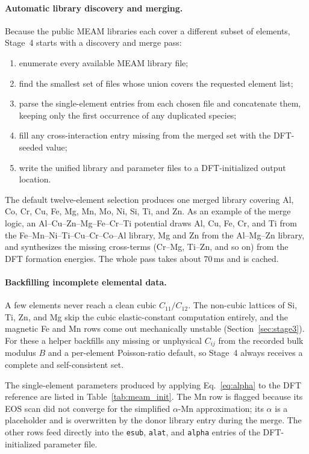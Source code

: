 \paragraph{Automatic library discovery and merging.}
Because the public MEAM libraries each cover a different subset of elements,
Stage~4 starts with a discovery and merge pass:
\begin{enumerate}
	\item enumerate every available MEAM library file;
	\item find the smallest set of files whose union covers the requested
	      element list;
	\item parse the single-element entries from each chosen file and
	      concatenate them, keeping only the first occurrence of any duplicated
	      species;
	\item fill any cross-interaction entry missing from the merged set with the
	      DFT-seeded value;
	\item write the unified library and parameter files to a DFT-initialized
	      output location.
\end{enumerate}
The default twelve-element selection produces one merged library covering Al,
Co, Cr, Cu, Fe, Mg, Mn, Mo, Ni, Si, Ti, and Zn. As an example of the merge
logic, an Al--Cu--Zn--Mg--Fe--Cr--Ti potential draws Al, Cu, Fe, Cr, and Ti
from the Fe--Mn--Ni--Ti--Cu--Cr--Co--Al library, Mg and Zn from the
Al--Mg--Zn library, and synthesizes the missing cross-terms (Cr--Mg, Ti--Zn,
and so on) from the DFT formation energies. The whole pass takes about
$70$\,ms and is cached.

\paragraph{Backfilling incomplete elemental data.}
A few elements never reach a clean cubic $C_{11}/C_{12}$. The non-cubic
lattices of Si, Ti, Zn, and Mg skip the cubic elastic-constant computation
entirely, and the magnetic Fe and Mn rows come out mechanically unstable
(Section~\ref{sec:stage3}). For these a helper backfills any missing or
unphysical $C_{ij}$ from the recorded bulk modulus $B$ and a per-element
Poisson-ratio default, so Stage~4 always receives a complete and
self-consistent set.

The single-element parameters produced by applying Eq.~\eqref{eq:alpha} to the
DFT reference are listed in Table~\ref{tab:meam_init}. The Mn row is flagged
because its EOS scan did not converge for the simplified $\alpha$-Mn
approximation; its $\alpha$ is a placeholder and is overwritten by the donor
library entry during the merge. The other rows feed directly into the
\texttt{esub}, \texttt{alat}, and \texttt{alpha} entries of the
DFT-initialized parameter file.


